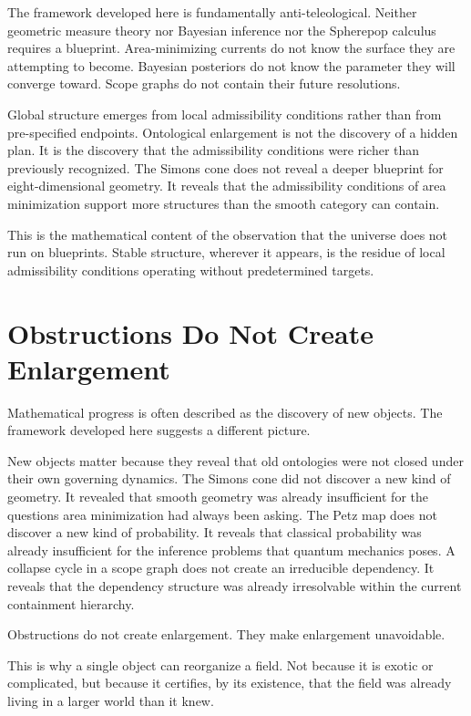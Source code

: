 \documentclass[12pt,oneside]{book}
\theoremstyle{plain}
\theoremstyle{definition}
\theoremstyle{remark}
\begin{document}
The framework developed here is fundamentally anti-teleological. Neither
geometric measure theory nor Bayesian inference nor the Spherepop calculus
requires a blueprint. Area-minimizing currents do not know the surface they
are attempting to become. Bayesian posteriors do not know the parameter they
will converge toward. Scope graphs do not contain their future resolutions.

Global structure emerges from local admissibility conditions rather than from
pre-specified endpoints. Ontological enlargement is not the discovery of a
hidden plan. It is the discovery that the admissibility conditions were richer
than previously recognized. The Simons cone does not reveal a deeper blueprint
for eight-dimensional geometry. It reveals that the admissibility conditions
of area minimization support more structures than the smooth category can
contain.

This is the mathematical content of the observation that the universe does
not run on blueprints. Stable structure, wherever it appears, is the residue
of local admissibility conditions operating without predetermined targets.

\section{Obstructions Do Not Create Enlargement}

Mathematical progress is often described as the discovery of new objects.
The framework developed here suggests a different picture.

New objects matter because they reveal that old ontologies were not closed
under their own governing dynamics. The Simons cone did not discover a new
kind of geometry. It revealed that smooth geometry was already insufficient
for the questions area minimization had always been asking. The Petz map does
not discover a new kind of probability. It reveals that classical probability
was already insufficient for the inference problems that quantum mechanics
poses. A collapse cycle in a scope graph does not create an irreducible
dependency. It reveals that the dependency structure was already irresolvable
within the current containment hierarchy.

Obstructions do not create enlargement. They make enlargement unavoidable.

This is why a single object can reorganize a field. Not because it is exotic
or complicated, but because it certifies, by its existence, that the field
was already living in a larger world than it knew.
\end{document}
